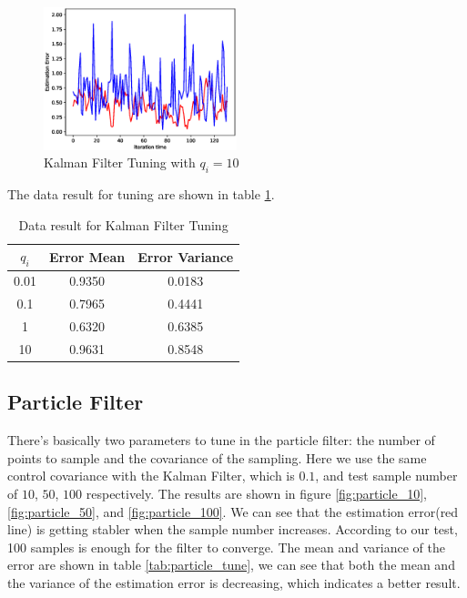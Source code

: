 \documentclass[letterpaper,11pt]{article}
\begin{document}
\begin{figure}[ht] 
	\centering
	\includegraphics[width=0.5\textwidth]{./kalman_10.eps}
	\caption{Kalman Filter Tuning with $q_i=10$}
	\label{fig:kalman_tune.4}
\end{figure}


The data result for tuning are shown in table \ref{tab:kalman_tune}.

\begin{table}[]
\centering
\begin{tabular}{|c|c|c|}
\hline
$q_i$ & Error Mean & Error Variance \\ \hline
0.01  & 0.9350     & 0.0183         \\ \hline
0.1   & 0.7965     & 0.4441         \\ \hline
1     & 0.6320     & 0.6385         \\ \hline
10    & 0.9631     & 0.8548         \\ \hline
\end{tabular}
\caption{Data result for Kalman Filter Tuning}
\label{tab:kalman_tune}
\end{table}

\subsection{Particle Filter}
There's basically two parameters to tune in the particle filter: the number of points to sample and the covariance of the sampling. Here we use the same control covariance with the Kalman Filter, which is $0.1$, and test sample number of $10$, $50$, $100$ respectively. The results are shown in figure \ref{fig:particle_10}, \ref{fig:particle_50}, and \ref{fig:particle_100}. We can see that the estimation error(red line) is getting stabler when the sample number increases. According to our test, 100 samples is enough for the filter to converge. The mean and variance of the error are shown in table \ref{tab:particle_tune}, we can see that both the mean and the variance of the estimation error is decreasing, which indicates a better result.
\end{document}
